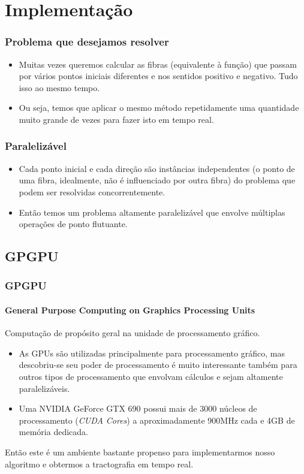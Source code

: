 \documentclass[brazil]{beamer}
\begin{document}
\section{Implementação}

\begin{frame}
  \frametitle{Problema que desejamos resolver}
  \begin{itemize}
    \item Muitas vezes queremos calcular as fibras (equivalente à função) que passam por vários pontos iniciais diferentes e nos sentidos positivo e negativo. Tudo isso ao mesmo tempo.
    \item Ou seja, temos que aplicar o mesmo método repetidamente uma quantidade muito grande de vezes para fazer isto em tempo real.
  \end{itemize}
\end{frame}

\begin{frame}
  \frametitle{Paralelizável}
  
  \begin{itemize}
    \item Cada ponto inicial e cada direção são instâncias independentes (o ponto de uma fibra, idealmente, não é influenciado por outra fibra) do problema que podem ser resolvidas concorrentemente.
    \item Então temos um problema altamente paralelizável que envolve múltiplas operações de ponto flutuante.
  \end{itemize}
\end{frame}


\subsection{GPGPU}
\begin{frame}
  \frametitle{GPGPU}
  \framesubtitle{General Purpose Computing on Graphics Processing Units}
  
  Computação de propósito geral na unidade de processamento gráfico.
  
  \begin{itemize}
    \item As GPUs são utilizadas principalmente para processamento gráfico, mas descobriu-se seu poder de processamento é muito interessante também para outros tipos de processamento que envolvam cálculos e sejam altamente paralelizáveis.
    \item Uma NVIDIA GeForce GTX 690 possui mais de 3000 núcleos de processamento (\textit{CUDA Cores}) a aproximadamente 900MHz cada e 4GB de memória dedicada.
  \end{itemize}
  
  Então este é um ambiente bastante propenso para implementarmos nosso algoritmo e obtermos a tractografia em tempo real.
\end{frame}
\end{document}
